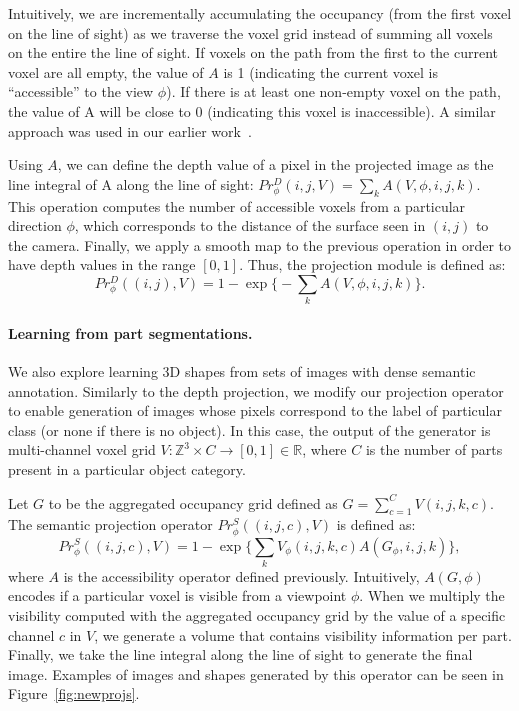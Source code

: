 Intuitively, we are incrementally accumulating the occupancy (from the first voxel on the line of sight) as we traverse the voxel grid 
instead of summing all voxels on the entire the line of sight. 
If voxels on the path from the first to the current voxel are all
empty, the value of $A$ is 1 (indicating the current voxel is
``accessible'' to the view $\phi$). 
If there is at least one non-empty voxel on the path, the value of A
will be close to 0 (indicating this voxel is inaccessible).
A similar approach was used in our earlier work~\cite{deepshapeprior}.

Using $A$, we can define the depth value of a pixel in the projected image
as the line integral of A along the line of sight: $Pr^{D}_\phi(i,j, V)=\sum_{k}A(V,\phi,i,j,k)$. 
This operation computes the number of accessible voxels from a particular direction $\phi$, which
corresponds to the distance of the surface seen in $(i,j)$ to the camera.
Finally, we apply a smooth map to the previous operation in order to have depth values in the range $[0, 1]$.
Thus, the projection module is defined as:
\begin{equation}
\label{eq:expdepth}
	Pr^{D}_\phi((i,j),V) = 1 - \exp\bigg\{-\sum_{k}A(V,\phi,i,j,k)\bigg\}.
\end{equation}

\paragraph{Learning from part segmentations.}
We also explore learning 3D shapes from sets of images with dense semantic annotation.
Similarly to the depth projection, we modify our projection operator to enable generation
of images whose pixels correspond to the label of particular class (or none if there is no object).
In this case, the output of the generator is multi-channel voxel grid 
$V:\mathbb{Z}^3 \times C \rightarrow [0,1] \in \mathbb{R}$, where $C$ is the number of parts present
in a particular object category.

Let $G$ to be the aggregated occupancy grid defined as $G=\sum_{c=1}^C V(i,j,k,c)$.
The semantic projection operator $Pr^{S}_\phi((i,j,c), V)$ is defined as:
\vspace{-10pt}
\begin{equation}
  Pr^{S}_\phi\left((i, j, c), V\right) = 1 - \exp\bigg\{\sum_k V_\phi(i,j,k,c) A(G_\phi, i, j, k)\bigg\},
\end{equation}
where $A$ is the accessibility operator defined previously.
Intuitively, $A(G, \phi)$ encodes if a particular voxel is visible from a viewpoint $\phi$.
When we multiply the visibility computed with the aggregated occupancy grid by the value of
a specific channel $c$ in $V$, we generate a volume that contains visibility information per part.
Finally, we take the line integral along the line of sight to generate the final image.
Examples of images and shapes generated by this operator can be seen in Figure~\ref{fig:newprojs}.

